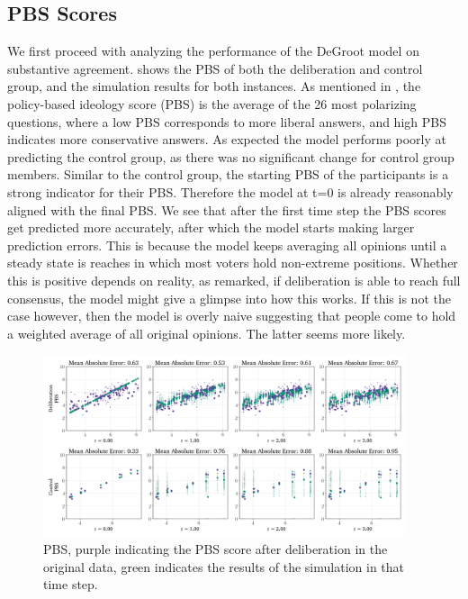 \subsection{PBS Scores}
We
first proceed with analyzing the performance of the DeGroot model on
substantive agreement.  shows the PBS of both the
deliberation and control group, and the simulation results for both instances.
As mentioned in , the policy-based ideology score (PBS) is the
average of the 26 most polarizing questions, where a low PBS corresponds to
more liberal answers, and high PBS indicates more conservative answers. As
expected the model performs poorly at predicting the control group, as there
was no significant change for control group members. Similar to the control
group, the starting  PBS of the participants is a strong indicator for
their  PBS. Therefore the model at t=0 is already reasonably aligned with
the final  PBS. We see that after the first time step the PBS scores get
predicted more accurately, after which the model starts making larger
prediction errors. This is because the model keeps averaging all opinions until
a steady state is reaches in which most voters hold non-extreme positions.
Whether this is positive depends on reality, as
\citet{elsterMARKETFORUMThree2002} remarked, if deliberation is able to reach
full consensus, the model might give a glimpse into how this works. If this is
not the case however, then the model is overly naive suggesting that people
come to hold a weighted average of all original opinions. The latter seems more
likely.


\begin{figure}[h]
	\begin{center}
		\includegraphics[width=0.95\textwidth]{Figures/pbs_scores.png}
	\end{center}
	\caption{ PBS, purple indicating the PBS score after deliberation in the original data, green indicates the results of the simulation in that time step.}\label{fig:pbs}
\end{figure}

